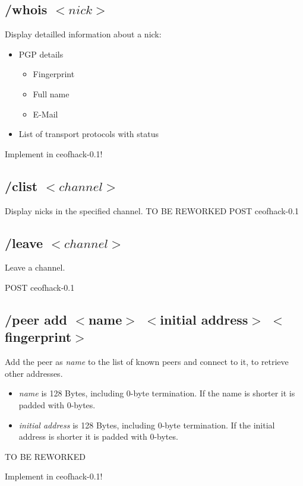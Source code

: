 \documentclass[12pt,a4paper]{book}
\begin{document}
\subsection{/whois $<nick>$}
Display detailled information about a nick:
\begin{itemize}
\item PGP details
\begin{itemize}
\item Fingerprint
\item Full name
\item E-Mail
\end{itemize}
\item List of transport protocols with status
\end{itemize}

Implement in ceofhack-0.1!
\subsection{/clist $<channel>$}
Display nicks in the specified channel.
TO BE REWORKED
POST ceofhack-0.1

\subsection{/leave $<channel>$}
Leave a channel.

POST ceofhack-0.1


\subsection{/peer add $<$name$>$ $<$initial address$>$ $<$fingerprint$>$}
Add the peer as \textit{name} to the list of known peers
and connect to it, to retrieve other addresses.
\begin{itemize}
\item \textit{name} is 128 Bytes, including 0-byte termination.
If the name is shorter it is padded with 0-bytes.
\item \textit{initial address} is 128 Bytes, including 0-byte termination.
If the initial address is shorter it is padded with 0-bytes.
\end{itemize}

TO BE REWORKED

Implement in ceofhack-0.1!
\end{document}
